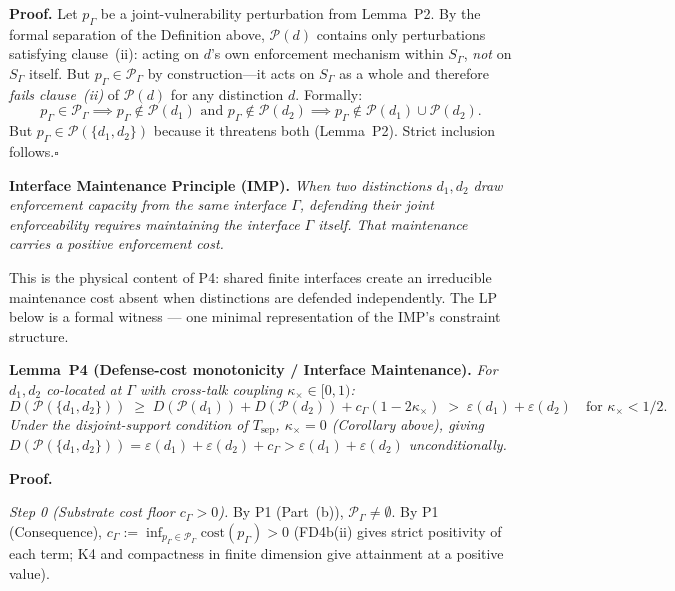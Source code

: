 \documentclass[11pt]{article}
\theoremstyle{remark}
\begin{document}
\smallskip\noindent\textbf{Proof.}
Let $p_\Gamma$ be a joint-vulnerability perturbation from Lemma~P2.  By the formal separation of the Definition above, $\mathcal{P}(d)$ contains only perturbations satisfying clause~(ii): acting on $d$'s own enforcement mechanism within $S_\Gamma$, \emph{not} on $S_\Gamma$ itself.  But $p_\Gamma \in \mathcal{P}_\Gamma$ by construction---it acts on $S_\Gamma$ as a whole and therefore \emph{fails clause~(ii)} of $\mathcal{P}(d)$ for any distinction $d$.  Formally:
\[
p_\Gamma \in \mathcal{P}_\Gamma \implies p_\Gamma \notin \mathcal{P}(d_1) \text{ and } p_\Gamma \notin \mathcal{P}(d_2) \implies p_\Gamma \notin \mathcal{P}(d_1) \cup \mathcal{P}(d_2).
\]
But $p_\Gamma \in \mathcal{P}(\{d_1,d_2\})$ because it threatens both (Lemma~P2).  Strict inclusion follows.\hfill$\square$

\smallskip\noindent\textbf{Interface Maintenance Principle (IMP).}
\emph{When two distinctions $d_1, d_2$ draw enforcement capacity from the same interface $\Gamma$, defending their joint enforceability requires maintaining the interface $\Gamma$ itself.  That maintenance carries a positive enforcement cost.}

This is the physical content of P4: shared finite interfaces create an irreducible maintenance cost absent when distinctions are defended independently.  The LP below is a formal witness --- one minimal representation of the IMP's constraint structure.

\smallskip\noindent\textbf{Lemma~P4 (Defense-cost monotonicity / Interface Maintenance).}
\emph{For $d_1, d_2$ co-located at $\Gamma$ with cross-talk coupling $\kappa_\times \in [0, 1)$:
\[
D(\mathcal{P}(\{d_1,d_2\})) \;\ge\; D(\mathcal{P}(d_1)) + D(\mathcal{P}(d_2)) + c_\Gamma(1 - 2\kappa_\times) \;>\; \varepsilon(d_1) + \varepsilon(d_2) \quad \text{for } \kappa_\times < 1/2.
\]
Under the disjoint-support condition of $T_{\mathrm{sep}}$, $\kappa_\times = 0$ (Corollary above), giving $D(\mathcal{P}(\{d_1,d_2\})) = \varepsilon(d_1) + \varepsilon(d_2) + c_\Gamma > \varepsilon(d_1) + \varepsilon(d_2)$ unconditionally.}

\smallskip\noindent\textbf{Proof.}

\textit{Step 0 (Substrate cost floor $c_\Gamma > 0$).}
By P1 (Part~(b)), $\mathcal{P}_\Gamma \ne \emptyset$.  By P1 (Consequence), $c_\Gamma := \inf_{p_\Gamma \in \mathcal{P}_\Gamma} \mathrm{cost}(p_\Gamma) > 0$ (FD4b(ii) gives strict positivity of each term; K4 and compactness in finite dimension give attainment at a positive value).
\end{document}
